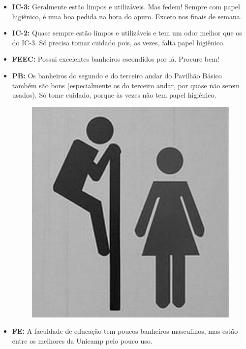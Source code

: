 \begin{itemize}

    \item  \textbf{IC-3:} Geralmente estão limpos e utilizáveis. Mas fedem!
    Sempre com papel higiênico, é uma boa pedida na hora do apuro. Exceto nos
    finais de semana.

    \item  \textbf{IC-2:} Quase sempre estão limpos e utilizáveis e tem um odor
    melhor que os do IC-3. Só precisa tomar cuidado pois, as vezes, falta papel
    higiênico.

    \item  \textbf{FEEC:} Possui excelentes banheiros escondidos por lá. Procure
    bem!

    \item  \textbf{PB:} Os banheiros do segundo e do terceiro andar do Pavilhão
    Básico também são bons (especialmente os do terceiro andar, por quase não
    serem usados). Só tome cuidado, porque às vezes não tem papel higiênico.

    \begin{figure}[h!]
        \centering
        \includegraphics[scale=0.50, keepaspectratio=true]{img/imgs/12-melhores_banheiros/banheiro.jpg}
    \end{figure}

    \item  \textbf{FE:} A faculdade de educação tem poucos banheiros masculinos,
    mas estão entre os melhores da Unicamp pelo pouco uso.


\end{itemize}
